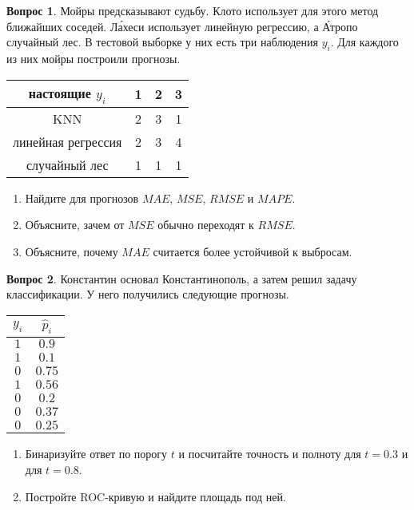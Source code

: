 \documentclass[12pt]{article}
\theoremstyle{definition}
\newtheorem{question}{Вопрос}
\begin{document}
\begin{question}
Мойры предсказывают судьбу. Клото использует для этого метод ближайших соседей. Ла́хеси использует линейную регрессию, а А́тропо случайный лес. В тестовой выборке у них есть три наблюдения $y_i$. Для каждого из них мойры построили прогнозы. 

\begin{center}
  \begin{tabular}{c|c|c|c}
    настоящие $y_i$ &  1 & 2 & 3 \\
    \hline
    KNN & 2 & 3 & 1  \\
    линейная регрессия &  2 & 3 & 4 \\
    случайный лес & 1 & 1 & 1 \\
  \end{tabular}
\end{center}

\begin{enumerate}
    \item Найдите для прогнозов $MAE$, $MSE$, $RMSE$ и $MAPE$.
    \item Объясните, зачем от $MSE$ обычно переходят к $RMSE$.
    \item Объясните, почему $MAE$ считается более устойчивой к выбросам.
\end{enumerate}
\end{question}

\newpage 

\begin{question}
    Константин основал Константинополь, а затем решил задачу классификации. У него получились следующие прогнозы. 
    
    \begin{center}
      \begin{tabular}{c|c}
        $y_i$ & $\hat p_i$ \\
        \hline
        $1$  & $0.9$ \\
        $1$ & $0.1$ \\
        $0$ & $0.75$ \\
        $1$ & $0.56$ \\
        $0$ & $0.2$ \\
        $0$ & $0.37$ \\
        $0$ & $0.25$ \\   
      \end{tabular}
    \end{center}
    
    \begin{enumerate}
      \item  Бинаризуйте ответ по порогу $t$ и посчитайте точность и полноту для $t = 0.3$ и для  $t = 0.8$.
      \item Постройте ROC-кривую и найдите площадь под ней. 
    \end{enumerate}
\end{question}
\end{document}
